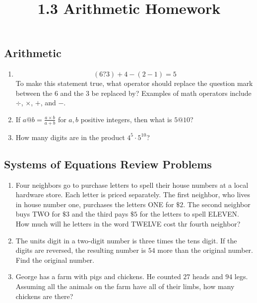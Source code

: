 \documentclass{article}
\title{1.3 Arithmetic Homework}
\author{}
\date{}
\begin{document}
\maketitle

\subsection*{Arithmetic}
\begin{enumerate}
    \item \[(6?3) + 4 - (2 - 1) = 5\]
    To make this statement true, what operator should replace the question mark 
    between the $6$ and the $3$ be replaced by? Examples of math operators include 
    $\div$, $\times$, $+$, and $-$. 
    \vspace{3cm}
    \item If $a@b = \frac{a \times b}{a + b}$ for $a, b$ positive integers, then 
    what is $5@10$?
    \vspace{3cm}
    \item How many digits are in the product $4^{5} \cdot 5^{10}$?
    \vspace{3cm} 
\end{enumerate}

\subsection*{Systems of Equations Review Problems}
\begin{enumerate}[resume]
    \item Four neighbors go to purchase letters to spell their house numbers
    at a local hardware store. Each letter is priced separately. The first
    neighbor, who lives in house number one, purchases the letters ONE for
    $\$2$. The second neighbor buys TWO for $\$3$ and the third pays $\$5$
    for the letters to spell ELEVEN. How much will he letters in the word
    TWELVE cost thr fourth neighbor?
    \vspace{3cm}
    \item The units digit in a two-digit number is three times the tens
    digit. If the digits are reversed, the resulting number is $54$ more
    than the original number. Find the original number.
    \vspace{3cm}
    \item George has a farm with pigs and chickens. He counted $27$ heads
    and $94$ legs. Assuming all the animals on the farm have all of their
    limbs, how many chickens are there?
    \vspace{3cm}
\end{enumerate}
\end{document}
